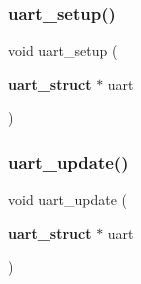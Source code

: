 \mbox{\label{uart_8c_a405c48b160a7d3acd62fffd1689c4565}} 
\subsubsection{uart\+\_\+setup()}
{\footnotesize\ttfamily void uart\+\_\+setup (\begin{DoxyParamCaption}\item[{\textbf{ uart\+\_\+struct} $\ast$}]{uart }\end{DoxyParamCaption})}

\mbox{\label{uart_8c_a68a0ecd6fa6c38259233f56ca5d8d534}} 
\subsubsection{uart\+\_\+update()}
{\footnotesize\ttfamily void uart\+\_\+update (\begin{DoxyParamCaption}\item[{\textbf{ uart\+\_\+struct} $\ast$}]{uart }\end{DoxyParamCaption})}

